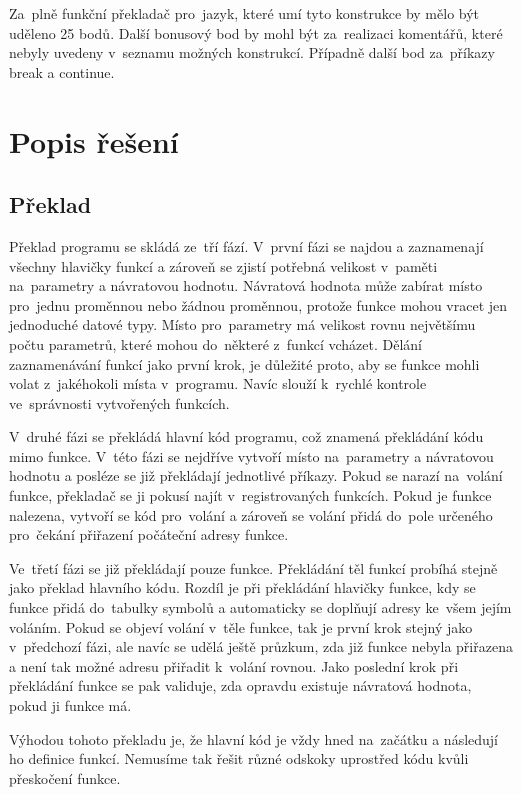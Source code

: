\documentclass[czech]{thesiskiv}
\begin{document}
\noindent Za~plně funkční překladač pro~jazyk, které umí tyto konstrukce by mělo být uděleno 25 bodů.
Další bonusový bod by mohl být za~realizaci komentářů, které nebyly uvedeny v~seznamu možných konstrukcí.
Případně další bod za~příkazy break a continue. 

\chapter{Popis řešení}

\section{Překlad}
\label{sec:preklad}

Překlad programu se skládá ze~tří fází. V~první fázi se najdou a zaznamenají všechny 
hlavičky funkcí a zároveň se zjistí potřebná velikost v~paměti na~parametry a návratovou hodnotu. 
Návratová hodnota může zabírat místo pro~jednu proměnnou nebo žádnou proměnnou, protože funkce mohou vracet jen 
jednoduché datové typy. Místo pro~parametry má velikost rovnu největšímu počtu parametrů, které mohou do~některé z~funkcí vcházet. 
Dělání zaznamenávání funkcí jako první krok, je důležité proto, aby se funkce mohli volat z~jakéhokoli místa v~programu. 
Navíc slouží k~rychlé kontrole ve~správnosti vytvořených funkcích.


V~druhé fázi se překládá hlavní kód programu, což znamená překládání kódu mimo funkce. 
V~této fázi se nejdříve vytvoří místo na~parametry a návratovou hodnotu a posléze se již překládají jednotlivé příkazy. 
Pokud se narazí na~volání funkce, překladač se ji pokusí najít v~registrovaných funkcích. Pokud je funkce nalezena, 
vytvoří se kód pro~volání a zároveň se volání přidá do~pole určeného pro~čekání přiřazení počáteční adresy funkce.


Ve~třetí fázi se již překládají pouze funkce. Překládání těl funkcí probíhá 
stejně jako překlad hlavního kódu. Rozdíl je při překládání hlavičky funkce, 
kdy se funkce přidá do~tabulky symbolů a automaticky se doplňují adresy ke~všem 
jejím voláním. Pokud se objeví volání v~těle funkce, tak je první krok stejný jako 
v~předchozí fázi, ale navíc se udělá ještě průzkum, zda již funkce nebyla přiřazena a není 
tak možné adresu přiřadit k~volání rovnou. Jako poslední krok při překládání funkce se 
pak validuje, zda opravdu existuje návratová hodnota, pokud ji funkce má.


Výhodou tohoto překladu je, že hlavní kód je vždy hned na~začátku a následují ho 
definice funkcí. Nemusíme tak řešit různé odskoky uprostřed kódu kvůli přeskočení funkce.
\end{document}

